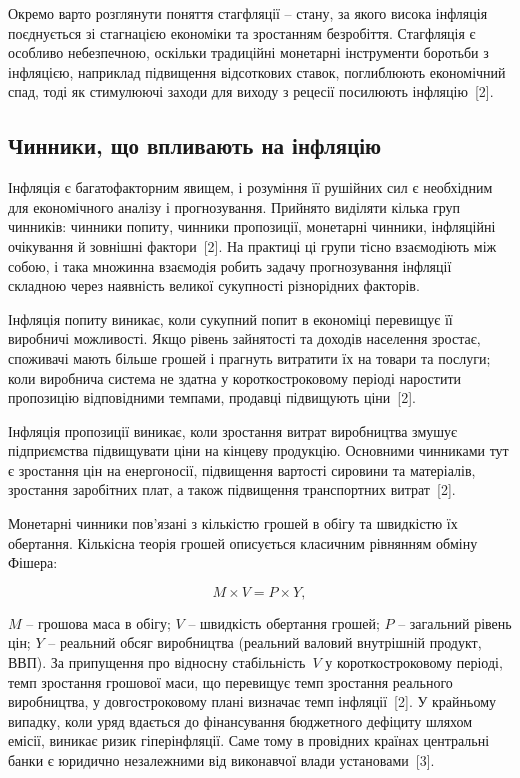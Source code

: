 \documentclass{bachelor_thesis}
\begin{document}
Окремо варто розглянути поняття стагфляції -- стану, за якого висока інфляція поєднується зі стагнацією економіки та зростанням безробіття. Стагфляція є особливо небезпечною, оскільки традиційні монетарні інструменти боротьби з інфляцією, наприклад підвищення відсоткових ставок, поглиблюють економічний спад, тоді як стимулюючі заходи для виходу з рецесії посилюють інфляцію~[2].

\subsection{Чинники, що впливають на інфляцію}

Інфляція є багатофакторним явищем, і розуміння її рушійних сил є необхідним для економічного аналізу і прогнозування. Прийнято виділяти кілька груп чинників: чинники попиту, чинники пропозиції, монетарні чинники, інфляційні очікування й зовнішні фактори~[2]. На практиці ці групи тісно взаємодіють між собою, і така множинна взаємодія робить задачу прогнозування інфляції складною через наявність великої сукупності різнорідних факторів.

Інфляція попиту виникає, коли сукупний попит в економіці перевищує її виробничі можливості. Якщо рівень зайнятості та доходів населення зростає, споживачі мають більше грошей і прагнуть витратити їх на товари та послуги; коли виробнича система не здатна у короткостроковому періоді наростити пропозицію відповідними темпами, продавці підвищують ціни~[2].

Інфляція пропозиції виникає, коли зростання витрат виробництва змушує підприємства підвищувати ціни на кінцеву продукцію. Основними чинниками тут є зростання цін на енергоносії, підвищення вартості сировини та матеріалів, зростання заробітних плат, а також підвищення транспортних витрат~[2].

Монетарні чинники пов'язані з кількістю грошей в обігу та швидкістю їх обертання. Кількісна теорія грошей описується класичним рівнянням обміну Фішера:

\begin{equation*}
M \times V = P \times Y,
\end{equation*}

 $M$ -- грошова маса в обігу; $V$ -- швидкість обертання грошей; $P$ -- загальний рівень цін; $Y$ -- реальний обсяг виробництва (реальний валовий внутрішній продукт, ВВП). За припущення про відносну стабільність~$V$ у короткостроковому періоді, темп зростання грошової маси, що перевищує темп зростання реального виробництва, у довгостроковому плані визначає темп інфляції~[2]. У крайньому випадку, коли уряд вдається до фінансування бюджетного дефіциту шляхом емісії, виникає ризик гіперінфляції. Саме тому в провідних країнах центральні банки є юридично незалежними від виконавчої влади установами~[3].
\end{document}
